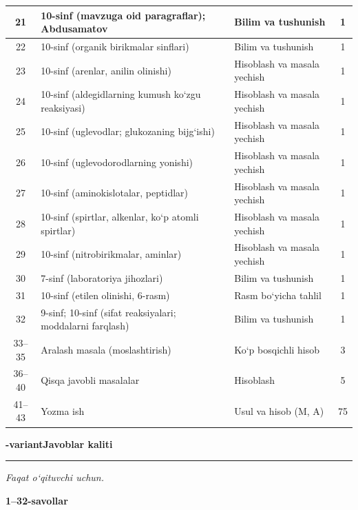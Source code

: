 \documentclass[11pt,a4paper]{article}
\newcommand{\hdrpill}[1]{\begin{tikzpicture}[baseline=0pt]\node[fill=ygreen,text=white,rounded corners=8pt,inner xsep=10pt,inner ysep=5pt,font=\fontsize{13}{15}\bfseries\selectfont] at (0,0.475){#1};\end{tikzpicture}}
\newcommand{\curvar}{}\fancyhead[R]{\hdrpill{\curvar}}
\begin{document}
{\begin{longtable}{|c|p{7.2cm}|p{5.4cm}|c|}
21 & 10-sinf (mavzuga oid paragraflar); Abdusamatov & Bilim va tushunish & 1\\\hline
22 & 10-sinf (organik birikmalar sinflari) & Bilim va tushunish & 1\\\hline
23 & 10-sinf (arenlar, anilin olinishi) & Hisoblash va masala yechish & 1\\\hline
24 & 10-sinf (aldegidlarning kumush ko`zgu reaksiyasi) & Hisoblash va masala yechish & 1\\\hline
25 & 10-sinf (uglevodlar; glukozaning bijg`ishi) & Hisoblash va masala yechish & 1\\\hline
26 & 10-sinf (uglevodorodlarning yonishi) & Hisoblash va masala yechish & 1\\\hline
27 & 10-sinf (aminokislotalar, peptidlar) & Hisoblash va masala yechish & 1\\\hline
28 & 10-sinf (spirtlar, alkenlar, ko`p atomli spirtlar) & Hisoblash va masala yechish & 1\\\hline
29 & 10-sinf (nitrobirikmalar, aminlar) & Hisoblash va masala yechish & 1\\\hline
30 & 7-sinf (laboratoriya jihozlari) & Bilim va tushunish & 1\\\hline
31 & 10-sinf (etilen olinishi, 6-rasm) & Rasm bo`yicha tahlil & 1\\\hline
32 & 9-sinf; 10-sinf (sifat reaksiyalari; moddalarni farqlash) & Bilim va tushunish & 1\\\hline
33--35 & Aralash masala (moslashtirish) & Ko`p bosqichli hisob & 3\\\hline
36--40 & Qisqa javobli masalalar & Hisoblash & 5\\\hline
41--43 & Yozma ish & Usul va hisob (M, A) & 75\\\hline
\end{longtable}}
\renewcommand{\curvar}{Javoblar}
\newpage
\noindent\textbf{\fontsize{13}{15}-variant}\hfill \textbf{Javoblar kaliti}\par\smallskip\hrule\smallskip
\textit{Faqat o`qituvchi uchun.}\par\medskip
\noindent\textbf{1--32-savollar}\par\smallskip
\end{document}
